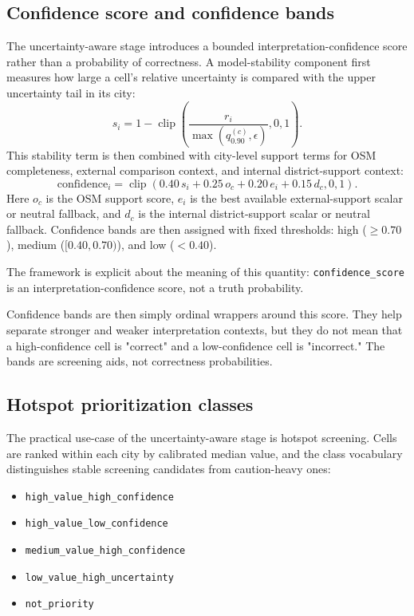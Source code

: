 \subsection{Confidence score and confidence bands}

The uncertainty-aware stage introduces a bounded interpretation-confidence score rather than a probability of correctness. A model-stability component first measures how large a cell's relative uncertainty is compared with the upper uncertainty tail in its city:
\[
s_i = 1 - \operatorname{clip}\!\left(
\frac{r_i}{\max(q_{0.90}^{(c)},\epsilon)}, 0, 1
\right).
\]
This stability term is then combined with city-level support terms for OSM completeness, external comparison context, and internal district-support context:
\[
\mathrm{confidence}_i =
\operatorname{clip}\!\left(
0.40\,s_i +
0.25\,o_c +
0.20\,e_i +
0.15\,d_c, 0, 1
\right).
\]
Here $o_c$ is the OSM support score, $e_i$ is the best available external-support scalar or neutral fallback, and $d_c$ is the internal district-support scalar or neutral fallback. Confidence bands are then assigned with fixed thresholds: high ($\ge 0.70$), medium ($[0.40,0.70)$), and low ($<0.40$).

The framework is explicit about the meaning of this quantity: \texttt{confidence\_score} is an interpretation-confidence score, not a truth probability.

Confidence bands are then simply ordinal wrappers around this score. They help separate stronger and weaker interpretation contexts, but they do not mean that a high-confidence cell is "correct" and a low-confidence cell is "incorrect." The bands are screening aids, not correctness probabilities.

\subsection{Hotspot prioritization classes}

The practical use-case of the uncertainty-aware stage is hotspot screening. Cells are ranked within each city by calibrated median value, and the class vocabulary distinguishes stable screening candidates from caution-heavy ones:

\begin{itemize}
\item \texttt{high\_value\_high\_confidence}
\item \texttt{high\_value\_low\_confidence}
\item \texttt{medium\_value\_high\_confidence}
\item \texttt{low\_value\_high\_uncertainty}
\item \texttt{not\_priority}
\end{itemize}

